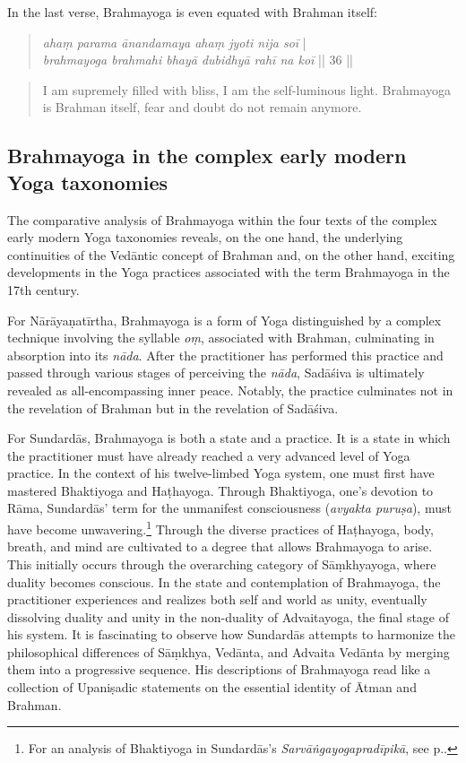In the last verse, Brahmayoga is even equated with Brahman itself:
\begin{quote}
\textit{ahaṃ parama ānandamaya ahaṃ jyoti nija soī} |\\
\textit{brahmayoga brahmahi bhayā dubidhyā rahī na koī} || 36 ||
\end{quote}
\begin{quote}
I am supremely filled with bliss, I am the self-luminous light. Brahmayoga is Brahman itself, fear and doubt do not remain anymore.
\end{quote}

\subsection{Brahmayoga in the complex early modern Yoga taxonomies}

The comparative analysis of Brahmayoga within the four texts of the complex early modern Yoga taxonomies reveals, on the one hand, the underlying continuities of the Vedāntic concept of Brahman and, on the other hand, exciting developments in the Yoga practices associated with the term Brahmayoga in the 17th century.

For Nārāyaṇatīrtha, Brahmayoga is a form of Yoga distinguished by a complex technique involving the syllable \textit{oṃ}, associated with Brahman, culminating in absorption into its \emph{nāda}. After the practitioner has performed this practice and passed through various stages of perceiving the \textit{nāda}, Sadāśiva is ultimately revealed as all-encompassing inner peace. Notably, the practice culminates not in the revelation of Brahman but in the revelation of Sadāśiva.

For Sundardās, Brahmayoga is both a state and a practice. It is a state in which the practitioner must have already reached a very advanced level of Yoga practice. In the context of his twelve-limbed Yoga system, one must first have mastered Bhaktiyoga and Haṭhayoga. Through Bhaktiyoga, one's devotion to Rāma, Sundardās' term for the unmanifest consciousness (\textit{avyakta puruṣa}), must have become unwavering.\footnote{For an analysis of Bhaktiyoga in Sundardās's \emph{Sarvāṅgayogapradīpikā}, see p.\pageref{sarvangabhakti}.} Through the diverse practices of Haṭhayoga, body, breath, and mind are cultivated to a degree that allows Brahmayoga to arise. This initially occurs through the overarching category of Sāṃkhyayoga, where duality becomes conscious. In the state and contemplation of Brahmayoga, the practitioner experiences and realizes both self and world as unity, eventually dissolving duality and unity in the non-duality of Advaitayoga, the final stage of his system. It is fascinating to observe how Sundardās attempts to harmonize the philosophical differences of Sāṃkhya, Vedānta, and Advaita Vedānta by merging them into a progressive sequence. His descriptions of Brahmayoga read like a collection of Upaniṣadic statements on the essential identity of Ātman and Brahman.

